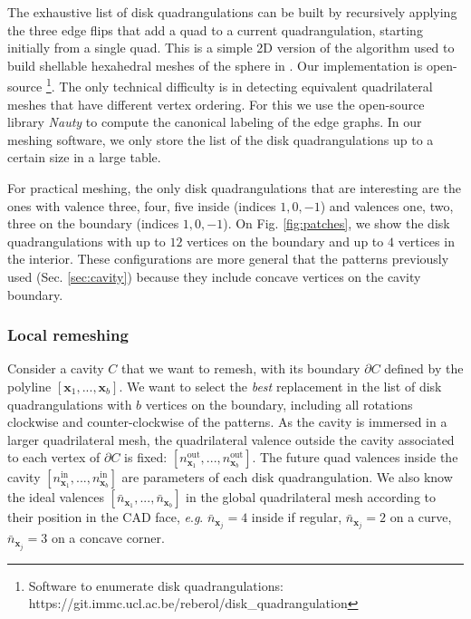 \documentclass[AMA,STIX1COL]{WileyNJD-v2}
\newcommand{\vx}{\ensuremath{\mathbf{x}}}
\newcommand{\eg}{\textit{e}.\textit{g}. }
\newcommand\rsec[1]{Sec. \ref{#1}}
\newcommand\rfig[1]{Fig. \ref{#1}}
\begin{document}
{The exhaustive list of disk quadrangulations can be built by recursively
applying the three edge flips that add a quad to a current quadrangulation,
starting initially from a single quad.  This is a simple 2D version of the
algorithm used to build shellable hexahedral meshes of the sphere 
in \cite{verhetsel2019}. Our implementation is open-source
\footnote{Software to enumerate disk quadrangulations: https://git.immc.ucl.ac.be/reberol/disk\_quadrangulation}.
The only technical difficulty is in detecting equivalent quadrilateral meshes
that have different vertex ordering. For this we use the open-source
library \emph{Nauty} \cite{nauty} to compute the canonical labeling of the
edge graphs. In our meshing software, we only store the list of the disk quadrangulations
up to a certain size in a large table.

For practical meshing, the only disk quadrangulations that are interesting are the
ones with valence three, four, five inside (indices $1,0,-1$) and valences one, two, three
on the boundary (indices $1,0,-1$). On \rfig{fig:patches}, we show the disk quadrangulations
with up to $12$ vertices on the boundary and up to $4$ vertices in the interior.
These configurations are more general that the patterns previously used (\rsec{sec:cavity})
because they include concave vertices on the cavity boundary.


\subsubsection {Local remeshing}
\label{ss:disk_remeshing}

Consider a cavity $C$ that we want to remesh, with its boundary $\partial C$ defined
by the polyline $[\vx_1, ..., \vx_b]$. We want to select the \emph{best}
replacement in the list of disk quadrangulations with $b$ vertices 
on the boundary, including all rotations clockwise and counter-clockwise
of the patterns.  As the cavity is immersed in a larger quadrilateral
mesh, the quadrilateral valence outside the cavity associated to
each vertex of $\partial C$ is fixed: $[n_{\vx_1}^\text{out}, ..., n_{\vx_b}^\text{out}]$. The future
quad valences inside the cavity $[n_{\vx_1}^\text{in}, ..., n_{\vx_b}^\text{in}]$ are parameters
of each disk quadrangulation. We also know the ideal valences $[\bar{n}_{\vx_1}, ..., \bar{n}_{\vx_b}]$
in the global quadrilateral mesh according to their position in the CAD face,
\eg $\bar{n}_{\vx_j}=4$ inside if regular, $\bar{n}_{\vx_j}=2$ on a curve, $\bar{n}_{\vx_j}=3$ on a concave corner.

}
\end{document}
